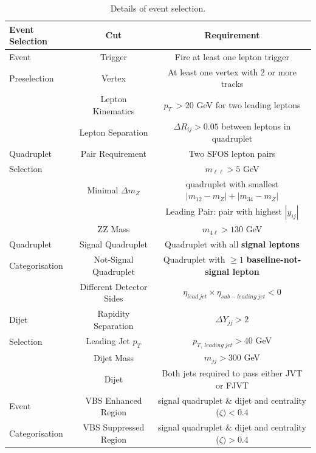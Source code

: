 \begin{table}[!htb]
	\centering
		\caption{Details of event selection.\label{tab:EventSelection}}
		\begin{tabular}{|| l || c | c ||}
		\hline
		Event Selection 		& Cut 					& Requirement														\\
		\hline\hline
		Event  				& Trigger 					&  Fire at least one lepton trigger										\\
		Preselection         		& Vertex				 	& At least one vertex with 2 or more tracks								\\
		\hline  
		 			& Lepton Kinematics 		& $p_{T}~ > 20$ GeV for two leading leptons						\\
					& Lepton Separation 		& $\Delta R_{ij} > 0.05$ between leptons in quadruplet		\\
		Quadruplet	& Pair Requirement 			& Two SFOS lepton pairs											\\
		Selection	&						& $m_{\ell\ell} > 5$ GeV									\\
					& Minimal $\Delta m_{Z}$ 	& quadruplet with smallest $|m_{12}	- m_{Z} | + |m_{34}	- m_{Z} |$\\
					&						& Leading Pair: pair with highest $|y_{ij}|$						\\
					& ZZ Mass				& $m_{4\ell} > 130 $ GeV											\\
		\hline  
		Quadruplet 			& Signal Quadruplet			& Quadruplet with all \textbf{signal leptons}							\\
		Categorisation			& Not-Signal Quadruplet 		& Quadruplet with $\geq 1$ \textbf{baseline-not-signal lepton}			\\
		\hline  
		 			& Different Detector Sides		& $\eta_{lead~jet} \times \eta_{sub-leading~jet} < 0 $			\\
		Dijet		& Rapidity Separation 		& $	\Delta Y_{jj}> 2 $												\\
		Selection	& Leading Jet $p_{T}$ 	& 	$p_{T,~leading~jet} > 40$ GeV				\\
					& Dijet Mass 				& $m_{jj} > 300 $ GeV													\\
					& Dijet 		& Both jets required to pass either JVT or FJVT 							\\
		\hline  
							
		Event				& VBS Enhanced Region 		& signal quadruplet $\&$ dijet and centrality ($\zeta) < 0.4 $				\\
		Categorisation			& VBS Suppressed Region 	& signal quadruplet $\&$ dijet and centrality ($\zeta) > 0.4$				\\
		
		\hline
	\end{tabular}
\end{table}

